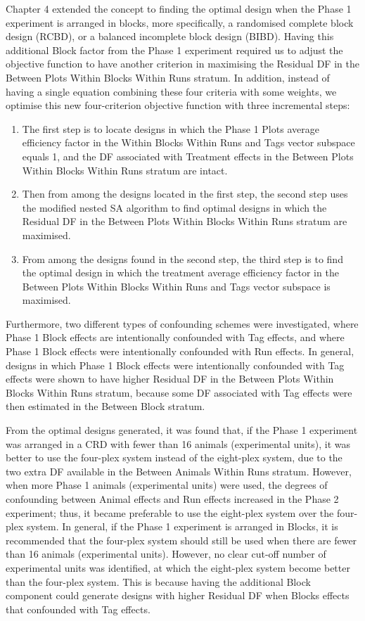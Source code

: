 Chapter 4 extended the concept to finding the optimal design when the Phase 1 experiment is arranged in blocks, more specifically, a randomised complete block design (RCBD), or a balanced incomplete block design (BIBD). Having this additional Block factor from the Phase 1 experiment required us to adjust the objective function to have another criterion in maximising the Residual DF in the Between Plots Within Blocks Within Runs stratum. In addition, instead of having a single equation combining these four criteria with some weights, we optimise this new four-criterion objective function with three incremental steps:
\begin{enumerate}
\item The first step is to locate designs in which the Phase 1 Plots average efficiency factor in the Within Blocks Within Runs and Tags vector subspace equals 1, and the DF associated with Treatment effects in the Between Plots Within Blocks Within Runs stratum are intact.
\item Then from among the designs located in the first step, the second step uses the modified nested SA algorithm to find optimal designs in which the Residual DF in the Between Plots Within Blocks Within Runs stratum are maximised.
\item From among the designs found in the second step, the third step is to find the optimal design in which the treatment average efficiency factor in the Between Plots Within Blocks Within Runs and Tags vector subspace is maximised.
\end{enumerate}

Furthermore, two different types of confounding schemes were investigated, where Phase 1 Block effects are intentionally confounded with Tag effects, and where Phase 1 Block effects were intentionally confounded with Run effects. In general, designs in which Phase 1 Block effects were intentionally confounded with Tag effects were shown to have higher Residual DF in the Between Plots Within Blocks Within Runs stratum, because some DF associated with Tag effects were then estimated in the Between Block stratum. 

From the optimal designs generated, it was found that, if the Phase 1 experiment was arranged in a CRD with fewer than 16 animals (experimental units), it was better to use the four-plex system instead of the eight-plex system, due to the two extra DF available in the Between Animals Within Runs stratum. However, when more Phase 1 animals (experimental units) were used, the degrees of confounding between Animal effects and Run effects increased in the Phase 2 experiment; thus, it became preferable to use the eight-plex system over the four-plex system. In general, if the Phase 1 experiment is arranged in Blocks, it is recommended that the four-plex system should still be used when there are fewer than 16 animals (experimental units). However, no clear cut-off number of experimental units was identified, at which the eight-plex system become better than the four-plex system. This is because having the additional Block component could generate designs with higher Residual DF when Blocks effects that confounded with Tag effects. 

